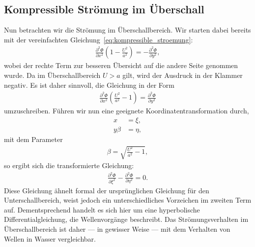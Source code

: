 \subsection{Kompressible Strömung im Überschall}
Nun betrachten wir die Strömung im Überschallbereich.
Wir starten dabei bereits mit der vereinfachten 
Gleichung~\eqref{eq:kompressible_stroemung}:
\begin{align*}
    \frac{\partial^2 \Phi}{\partial x^2}
    \left(1 - \frac{U^2}{a^2}\right)
    =
    -\frac{\partial^2 \Phi}{\partial y^2},
\end{align*}
wobei der rechte Term zur besseren Übersicht auf die 
andere Seite genommen wurde.
Da im Überschallbereich $U > a$ gilt, wird der Ausdruck 
in der Klammer negativ.
Es ist daher sinnvoll, die Gleichung in der Form
\begin{align*}
    \frac{\partial^2 \Phi}{\partial x^2}
    \left(\frac{U^2}{a^2} - 1\right)
    =
    \frac{\partial^2 \Phi}{\partial y^2}
\end{align*}
umzuschreiben.
Führen wir nun eine geeignete Koordinatentransformation durch,
\begin{align*}
    x 
    &= 
    \xi, \\
    y \beta 
    &= 
    \eta,
\end{align*}
mit dem Parameter
\begin{align*}
    \beta = \sqrt{\frac{U^2}{a^2} - 1},
\end{align*}
so ergibt sich die transformierte Gleichung:
\begin{align}
    \frac{\partial^2 \Phi}{\partial \xi^2}
    -
    \frac{\partial^2 \Phi}{\partial \eta^2}
    =
    0.\label{eq:wellengl_ueberschall}
\end{align}
Diese Gleichung ähnelt formal der ursprünglichen Gleichung 
für den Unterschallbereich, weist jedoch ein 
unterschiedliches Vorzeichen im zweiten Term auf.
Dementsprechend handelt es sich hier um eine hyperbolische 
Differentialgleichung, die Wellenvorgänge beschreibt.
Das Strömungsverhalten im Überschallbereich ist daher — 
in gewisser Weise — mit dem Verhalten von Wellen in Wasser vergleichbar.

